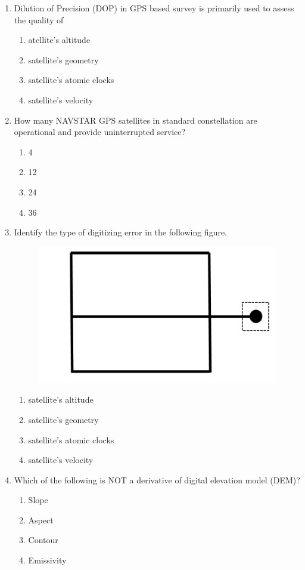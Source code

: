 \documentclass[12pt]{article}
\begin{document}
\begin{enumerate}
\item Dilution of Precision (DOP) in GPS based survey is primarily used to assess the
quality of
\begin{enumerate}
    \item atellite’s altitude 
   \item satellite’s geometry  
   \item satellite’s atomic clocks 
   \item satellite’s velocity 
\end{enumerate}

\item How many NAVSTAR GPS satellites in standard constellation are operational
and provide uninterrupted service?
\begin{enumerate}
   \item 4 
   \item 12 
   \item 24 
   \item 36
\end{enumerate}

\item Identify the type of digitizing error in the following figure.

\begin{figure}[H]
\centering
\includegraphics[width=0.5\linewidth]{Figs/LatexImage3.png}
\end{figure}

\begin{enumerate}
     
   \item satellite’s altitude 
   \item satellite’s geometry  
   \item satellite’s atomic clocks 
   \item satellite’s velocity
\end{enumerate}

\item Which of the following is NOT a derivative of digital elevation model (DEM)?

\begin{enumerate}
    \item Slope 
   \item Aspect 
   \item Contour 
   \item Emissivity 
\end{enumerate}


\end{enumerate}
\end{document}
